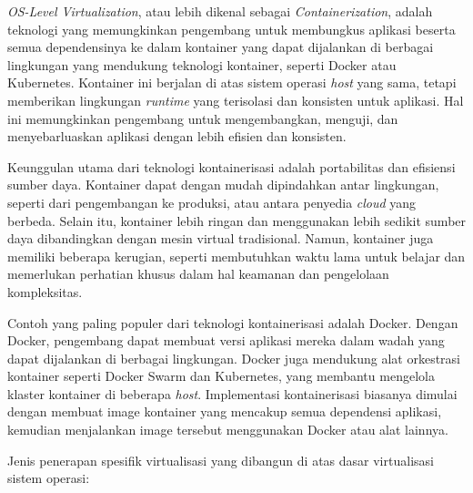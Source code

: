 \documentclass[12pt]{article}
\begin{document}
\begin{enumerate}
    \par \textit{OS-Level Virtualization}, atau lebih dikenal sebagai \textit{Containerization}, adalah teknologi yang memungkinkan pengembang untuk membungkus aplikasi beserta semua dependensinya ke dalam kontainer yang dapat dijalankan di berbagai lingkungan yang mendukung teknologi kontainer, seperti Docker atau  Kubernetes. Kontainer ini berjalan di atas sistem operasi \textit{host} yang sama, tetapi memberikan lingkungan \textit{runtime} yang terisolasi dan konsisten untuk aplikasi. Hal ini memungkinkan pengembang untuk mengembangkan, menguji, dan menyebarluaskan aplikasi dengan lebih efisien dan konsisten.

    \par Keunggulan utama dari teknologi kontainerisasi adalah portabilitas dan efisiensi sumber daya. Kontainer dapat dengan mudah dipindahkan antar lingkungan, seperti dari pengembangan ke produksi, atau antara penyedia \textit{cloud} yang berbeda. Selain itu, kontainer lebih ringan dan menggunakan lebih sedikit sumber daya dibandingkan dengan mesin virtual tradisional. Namun, kontainer juga memiliki beberapa kerugian, seperti membutuhkan waktu lama untuk belajar dan memerlukan perhatian khusus dalam hal keamanan dan pengelolaan kompleksitas.
    
    \par Contoh yang paling populer dari teknologi kontainerisasi adalah Docker. Dengan Docker, pengembang dapat membuat versi aplikasi mereka dalam wadah yang dapat dijalankan di berbagai lingkungan. Docker juga mendukung alat orkestrasi kontainer seperti Docker Swarm dan Kubernetes, yang membantu mengelola klaster kontainer di beberapa \textit{host}. Implementasi kontainerisasi biasanya dimulai dengan membuat image kontainer yang mencakup semua dependensi aplikasi, kemudian menjalankan image tersebut menggunakan Docker atau alat lainnya.
\end{enumerate}

\par Jenis penerapan spesifik virtualisasi yang dibangun di atas dasar virtualisasi sistem operasi:
\end{document}
